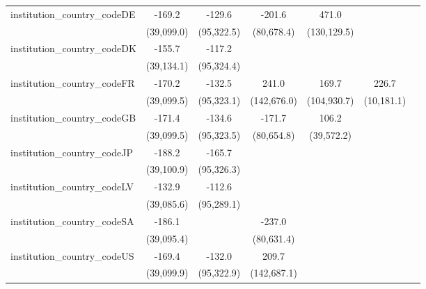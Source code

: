 \begin{tabular}{lcccccc}
   institution\_country\_codeDE          & -169.2       & -129.6        & -201.6      & 471.0       &               &   \\   
                                         & (39,099.0)   & (95,322.5)    & (80,678.4)  & (130,129.5) &               &   \\   
   institution\_country\_codeDK          & -155.7       & -117.2        &             &             &               &   \\   
                                         & (39,134.1)   & (95,324.4)    &             &             &               &   \\   
   institution\_country\_codeFR          & -170.2       & -132.5        & 241.0       & 169.7       & 226.7         &   \\   
                                         & (39,099.5)   & (95,323.1)    & (142,676.0) & (104,930.7) & (10,181.1)    &   \\   
   institution\_country\_codeGB          & -171.4       & -134.6        & -171.7      & 106.2       &               &   \\   
                                         & (39,099.5)   & (95,323.5)    & (80,654.8)  & (39,572.2)  &               &   \\   
   institution\_country\_codeJP          & -188.2       & -165.7        &             &             &               &   \\   
                                         & (39,100.9)   & (95,326.3)    &             &             &               &   \\   
   institution\_country\_codeLV          & -132.9       & -112.6        &             &             &               &   \\   
                                         & (39,085.6)   & (95,289.1)    &             &             &               &   \\   
   institution\_country\_codeSA          & -186.1       &               & -237.0      &             &               &   \\   
                                         & (39,095.4)   &               & (80,631.4)  &             &               &   \\   
   institution\_country\_codeUS          & -169.4       & -132.0        & 209.7       &             &               &   \\   
                                         & (39,099.9)   & (95,322.9)    & (142,687.1) &             &               &   \\   

\end{tabular}
